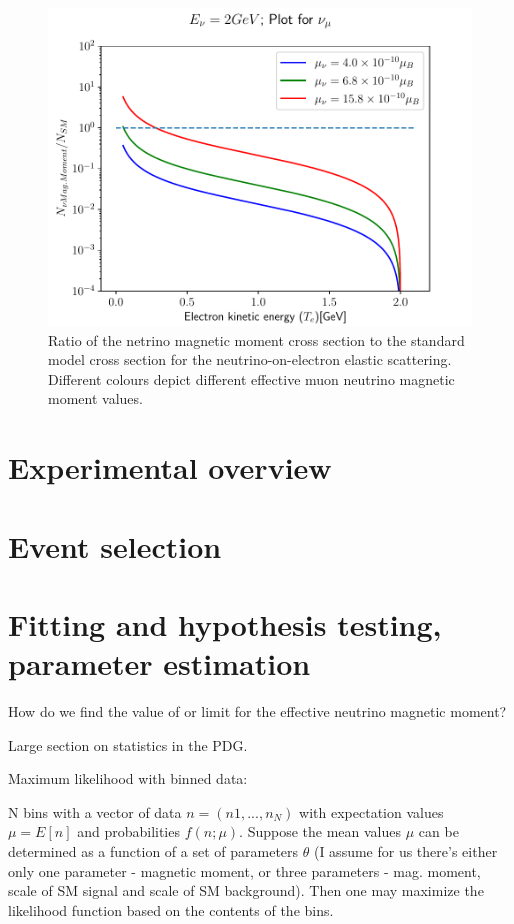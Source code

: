 \begin{figure}[hbtp]
\centering
\includegraphics[width=.7\textwidth]{Plots/NuMM/RatioNumuMMCompLinX.pdf}
\caption{Ratio of the netrino magnetic moment cross section to the standard model cross section for the neutrino-on-electron elastic scattering. Different colours depict different effective muon neutrino magnetic moment values.}
\label{fig:NuMMCrossSectionRatios}
\end{figure}


\iffalse
\section{Experimental overview}


\section{Event selection}

\section{Fitting and hypothesis testing, parameter estimation}
How do we find the value of or limit for the effective neutrino magnetic moment?

Large section on statistics in the PDG.

Maximum likelihood with binned data:

N bins with a vector of data $n=\left(n1,...,n_N \right)$ with expectation values $\mu=E\left[n\right]$ and probabilities $f\left(n;\mu\right)$. Suppose the mean values $\mu$ can be determined as a function of a set of parameters $\theta$ (I assume for us there's either only one parameter - magnetic moment, or three parameters - mag. moment, scale of SM signal and scale of SM background). Then one may maximize the likelihood function based on the contents of the bins.

